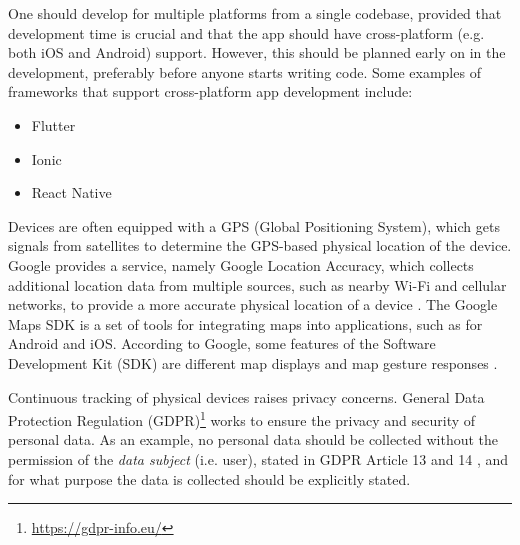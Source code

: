 \documentclass{article}
\begin{document}
One should develop for multiple platforms from a single codebase, provided that development time is crucial and that the app should have cross-platform (e.g. both iOS and Android) support. However, this should be planned early on in the development, preferably before anyone starts writing code. Some examples of frameworks that support cross-platform app development include:

\begin{itemize}
    \item Flutter
    \item Ionic
    \item React Native
\end{itemize}

Devices are often equipped with a GPS (Global Positioning System), which gets signals from satellites to determine the GPS-based physical location of the device. Google provides a service, namely Google Location Accuracy, which collects additional location data from multiple sources, such as nearby Wi-Fi and cellular networks, to provide a more accurate physical location of a device \cite{noauthor_how_nodate}. The Google Maps SDK is a set of tools for integrating maps into applications, such as for Android and iOS. According to Google, some features of the Software Development Kit (SDK) are different map displays and map gesture responses \cite{noauthor_maps_nodate}. 

Continuous tracking of physical devices raises privacy concerns. General Data Protection Regulation (GDPR)\footnote{\url{https://gdpr-info.eu/}} works to ensure the privacy and security of personal data. As an example, no personal data should be collected without the permission of the \emph{data subject} (i.e. user), stated in GDPR Article 13 and 14 \cite{noauthor_guide_nodate}, and for what purpose the data is collected should be explicitly stated.
\end{document}

